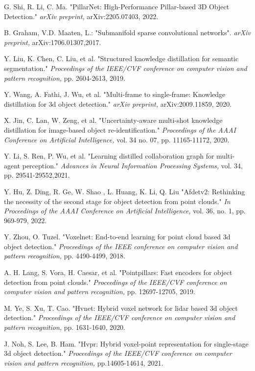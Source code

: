 \documentclass[lettersize,journal]{IEEEtran}
\begin{document}
\begin{thebibliography}{1}
G. Shi, R. Li, C. Ma. "PillarNet: High-Performance Pillar-based 3D Object Detection." {\it{ arXiv preprint,}} arXiv:2205.07403, 2022.

B. Graham, V.D. Maaten, L.: "Submanifold sparse convolutional networks".{\it{  arXiv preprint,}} arXiv:1706.01307,2017.



Y. Liu, K. Chen, C. Liu, et al. "Structured knowledge distillation for semantic segmentation." {\it{Proceedings of the IEEE/CVF conference on computer vision and pattern recognition,}} pp. 2604-2613, 2019.

Y. Wang, A. Fathi, J. Wu, et al. "Multi-frame to single-frame: Knowledge distillation for 3d object detection." {\it{arXiv preprint,}} arXiv:2009.11859, 2020. 

X. Jin, C. Lan, W. Zeng, et al. "Uncertainty-aware multi-shot knowledge distillation for image-based object re-identification." {\it{Proceedings of the AAAI Conference on Artificial Intelligence,}} vol. 34 no. 07, pp. 11165-11172, 2020.

Y. Li, S. Ren, P. Wu, et al. "Learning distilled collaboration graph for multi-agent perception." {\it{Advances in Neural Information Processing Systems,}} vol. 34, pp. 29541-29552,2021.


Y. Hu, Z. Ding, R. Ge, W. Shao , L. Huang, K. Li, Q. Liu  "Afdetv2: Rethinking the necessity of the second stage for object detection from point clouds." {\it{In Proceedings of the AAAI Conference on Artificial Intelligence,}} vol. 36, no. 1, pp. 969-979, 2022.



Y. Zhou, O. Tuzel. "Voxelnet: End-to-end learning for point cloud based 3d object detection." {\it{Proceedings of the IEEE conference on computer vision and pattern recognition,}} pp. 4490-4499, 2018.

A. H. Lang, S. Vora, H. Caesar, et al. "Pointpillars: Fast encoders for object detection from point clouds." {\it{Proceedings of the IEEE/CVF conference on computer vision and pattern recognition,}} pp. 12697-12705, 2019.


M. Ye, S. Xu, T. Cao. "Hvnet: Hybrid voxel network for lidar based 3d object detection." {\it{Proceedings of the IEEE/CVF conference on computer vision and pattern recognition,}} pp. 1631-1640, 2020.

J. Noh, S. Lee, B. Ham. "Hvpr: Hybrid voxel-point representation for single-stage 3d object detection." {\it{Proceedings of the IEEE/CVF conference on computer vision and pattern recognition,}} pp.14605-14614, 2021.






\end{thebibliography}
\end{document}
